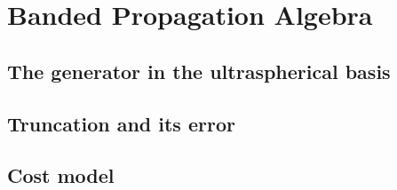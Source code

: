 
\section{Banded Propagation Algebra}
\label{p2:apx:banded}

\subsection{The generator in the ultraspherical basis}
\label{p2:sub:apx_generator_basis}

\subsection{Truncation and its error}
\label{p2:sub:apx_truncation_error}

\subsection{Cost model}
\label{p2:sub:apx_cost_model}
